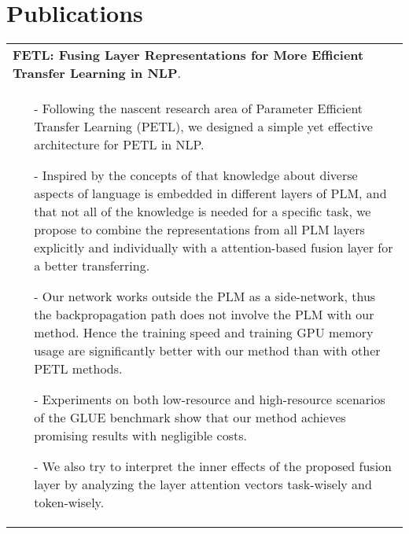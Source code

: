 \documentclass[a4paper,12pt]{ctexart}
\newcommand{\signed}[1]{%
\unskip\nobreak\hfil\penalty50
   \hskip2em\hbox{}\nobreak\hfil#1
   \parfillskip=0pt \finalhyphendemerits=0 }
\begin{document}
\section{Publications}

\begin{tabularx}{\linewidth}{ @{}X@{} }
\textbf{FETL: Fusing Layer Representations for More Efficient Transfer Learning in NLP}. \signed{\textit{zhuwenq}. under review.}\\[3.75pt]
\begin{minipage}[t]{\linewidth}
    \begin{itemize}[nosep,after=\strut, leftmargin=1em, itemsep=3pt]
        \item[-] Following the nascent research area of Parameter Efficient Transfer Learning (PETL),
        we designed a simple yet effective architecture for PETL in NLP.
        \item[-] Inspired by the concepts of that knowledge about diverse aspects of language is embedded
        in different layers of PLM, and that not all of the knowledge is needed for a specific task,
        we propose to combine the representations from all PLM layers explicitly and individually
        with a attention-based fusion layer for a better transferring.
        \item[-] Our network works outside the PLM as a side-network, thus the backpropagation
        path does not involve the PLM with our method. Hence the training speed and training GPU
        memory usage are significantly better with our method than with other PETL methods.
        \item[-] Experiments on both low-resource and high-resource scenarios of the GLUE benchmark
        show that our method achieves promising results with negligible costs.
        \item[-] We also try to interpret the inner effects of the proposed fusion layer by analyzing
        the layer attention vectors task-wisely and token-wisely.
    \end{itemize}
    \end{minipage}
\end{tabularx}

\end{document}
